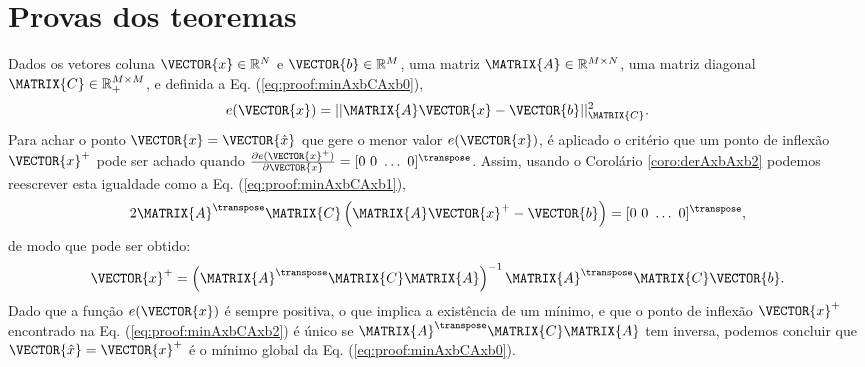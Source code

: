 \section{Provas dos teoremas}
 
\begin{myproofT}\label{proof:theo:minAxbCAxb}
Dados
os vetores coluna $\VECTOR{x}\in \mathbb{R}^N$ e $\VECTOR{b}\in \mathbb{R}^M$,  
uma matriz $\MATRIX{A} \in \mathbb{R}^{M\times N}$, 
uma matriz diagonal $\MATRIX{C} \in \mathbb{R}^{M\times M}_+$, e 
definida a Eq. (\ref{eq:proof:minAxbCAxb0}),
\begin{equation}\label{eq:proof:minAxbCAxb0}
e(\VECTOR{x})=||\MATRIX{A}\VECTOR{x}-\VECTOR{b}||_{\MATRIX{C}}^2.
\end{equation}
Para achar o ponto $\VECTOR{x}=\VECTOR{\hat{x}}$ que gere o menor valor $e(\VECTOR{x})$, é aplicado
o critério que um ponto de inflexão $\VECTOR{x}^+$ pode ser achado quando 
$\frac{\partial e(\VECTOR{x}^+)}{\partial \VECTOR{x} }=[0~ 0~ \hdots~ 0 ]^{\transpose}$.
Assim, usando o Corolário \ref{coro:derAxbAxb2} podemos 
reescrever esta igualdade como a Eq. (\ref{eq:proof:minAxbCAxb1}),
\begin{equation}\label{eq:proof:minAxbCAxb1}
2 \MATRIX{A}^{\transpose}\MATRIX{C}\left(\MATRIX{A}\VECTOR{x}^+-\VECTOR{b}\right)=[0~ 0~ \hdots~ 0 ]^{\transpose},
\end{equation}
de modo que pode ser obtido:
\begin{equation}\label{eq:proof:minAxbCAxb2}
\VECTOR{x}^+=\left( \MATRIX{A}^{\transpose}\MATRIX{C}\MATRIX{A} \right)^{-1} \MATRIX{A}^{\transpose}\MATRIX{C} \VECTOR{b}.
\end{equation}
Dado que  a função $e(\VECTOR{x})$ é sempre positiva, o que implica a existência de um mínimo,
e que o ponto de inflexão $\VECTOR{x}^+$ encontrado na Eq. (\ref{eq:proof:minAxbCAxb2}) 
é único se $\MATRIX{A}^{\transpose}\MATRIX{C}\MATRIX{A}$ tem inversa, 
podemos concluir que  $\VECTOR{\hat{x}}=\VECTOR{x}^+$ é o mínimo global da Eq. (\ref{eq:proof:minAxbCAxb0}).
\end{myproofT}

